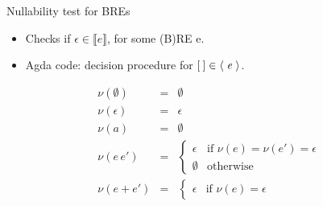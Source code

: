 \documentclass{beamer}
\newcommand{\D}[1]{\blue{\mathsf{#1}}}
\newcommand{\C}[1]{\red{\mathsf{#1}}}
\newcommand{\V}[1]{\purple{\mathit{#1}}}
\newcommand{\sembrack}[1]{\ensuremath{\llbracket #1 \rrbracket}}
\begin{document}
   \begin{frame}{Nullability test for BREs}
     \begin{itemize}
       \item Checks if $\epsilon \in \sembrack{e}$, for some (B)RE e.
       \item Agda code: decision procedure for \ensuremath{\C{\lbrack\:\rbrack}\;\D{\in\langle}\;\V{e}\;\D{\rangle}}.
     \end{itemize}
                    \[
                     \begin{array}{lcl}
                          \nu(\emptyset) & = & \emptyset \\
                          \nu(\epsilon)    & = & \epsilon \\
                          \nu(a)                & = & \emptyset \\
                          \nu(e\,e')           & = & \left\{
                                                                  \begin{array}{ll}
                                                                       \epsilon &
                                                                                  \text{if
                                                                                  }\nu(e)
                                                                                  =
                                                                                  \nu(e')
                                                                                  =
                                                                                  \epsilon
                                                                    \\
                                                                    \emptyset &
                                                                                \text{otherwise}
                                                                  \end{array}
                                                              \right. \\
                          \nu(e + e')  & = & \left\{
                                                          \begin{array}{ll}
                                                               \epsilon & \text{if
                                                                          }\nu(e) =
                                                                          \epsilon

\end{array}
\end{array}\]
\end{frame}
\end{document}
